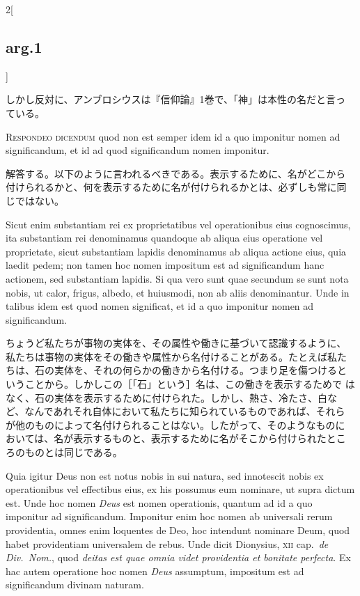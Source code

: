\documentclass[paper=a4paper,fontsize=10pt,jafontsize=9pt,titlepage]{jlreq}
\begin{document}
\begin{paracol}{2}[\subsection{arg.1}]
\switchcolumn

しかし反対に、アンブロシウスは『信仰論』1巻で、「神」は本性の名だと言っ
ている。


{\scshape Respondeo dicendum} quod non est semper idem id a quo
imponitur nomen ad significandum, et id ad quod significandum nomen
imponitur.

\switchcolumn

解答する。以下のように言われるべきである。表示するために、名がどこから
付けられるかと、何を表示するために名が付けられるかとは、必ずしも常に同
じではない。

\switchcolumn*

Sicut enim substantiam rei ex proprietatibus vel operationibus eius
cognoscimus, ita substantiam rei denominamus quandoque ab aliqua eius
operatione vel proprietate, sicut substantiam lapidis denominamus ab
aliqua actione eius, quia laedit pedem; non tamen hoc nomen impositum
est ad significandum hanc actionem, sed substantiam lapidis. Si qua
vero sunt quae secundum se sunt nota nobis, ut calor, frigus, albedo,
et huiusmodi, non ab aliis denominantur. Unde in talibus idem est quod
nomen significat, et id a quo imponitur nomen ad significandum.

\switchcolumn

ちょうど私たちが事物の実体を、その属性や働きに基づいて認識するように、
私たちは事物の実体をその働きや属性から名付けることがある。たとえば私た
ちは、石の実体を、それの何らかの働きから名付ける。つまり足を傷つけると
いうことから。しかしこの［「石」という］名は、この働きを表示するためで
はなく、石の実体を表示するために付けられた。しかし、熱さ、冷たさ、白な
ど、なんであれそれ自体において私たちに知られているものであれば、それら
が他のものによって名付けられることはない。したがって、そのようなものに
おいては、名が表示するものと、表示するために名がそこから付けられたとこ
ろのものとは同じである。

\switchcolumn*

Quia igitur Deus non est notus nobis in sui natura, sed innotescit
nobis ex operationibus vel effectibus eius, ex his possumus eum
nominare, ut supra dictum est. Unde hoc nomen {\itshape Deus} est
nomen operationis, quantum ad id a quo imponitur ad
significandum. Imponitur enim hoc nomen ab universali rerum
providentia, omnes enim loquentes de Deo, hoc intendunt nominare Deum,
quod habet providentiam universalem de rebus. Unde dicit Dionysius,
{\scshape xii} cap.~{\itshape de Div.~Nom.}, quod {\itshape deitas est
quae omnia videt providentia et bonitate perfecta}. Ex hac autem
operatione hoc nomen {\itshape Deus} assumptum, impositum est ad
significandum divinam naturam.


\end{paracol}
\end{document}
